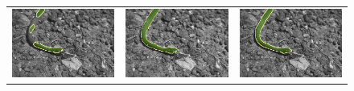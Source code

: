 \documentclass[smallextended]{svjour3}       %
\begin{document}
{{\begin{figure}[ht!]
\begin{tabular}{ccc}
		\includegraphics[scale=0.2]{segmentation_bc_snake_gc-seg.png} &
		\includegraphics[scale=0.2]{segmentation_schoenemann_snake_snake-seg.png} &
		\includegraphics[scale=0.2]{segmentation_bc_snake_corrected-seg.png}\\

\end{tabular}
\end{figure}}}
\end{document}
